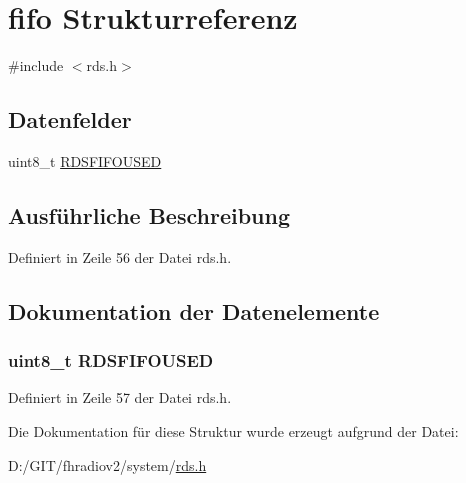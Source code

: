 \hypertarget{structfifo}{}\section{fifo Strukturreferenz}
\label{structfifo}


{\ttfamily \#include $<$rds.\+h$>$}

\subsection*{Datenfelder}
\begin{DoxyCompactItemize}
\item 
uint8\+\_\+t \hyperlink{structfifo_a8f4ac68e6765f535c5abca00d2a32a89}{R\+D\+S\+F\+I\+F\+O\+U\+S\+E\+D}
\end{DoxyCompactItemize}


\subsection{Ausführliche Beschreibung}


Definiert in Zeile 56 der Datei rds.\+h.



\subsection{Dokumentation der Datenelemente}
\hypertarget{structfifo_a8f4ac68e6765f535c5abca00d2a32a89}{}
\subsubsection[{R\+D\+S\+F\+I\+F\+O\+U\+S\+E\+D}]{\setlength{\rightskip}{0pt plus 5cm}uint8\+\_\+t R\+D\+S\+F\+I\+F\+O\+U\+S\+E\+D}\label{structfifo_a8f4ac68e6765f535c5abca00d2a32a89}


Definiert in Zeile 57 der Datei rds.\+h.



Die Dokumentation für diese Struktur wurde erzeugt aufgrund der Datei\+:\begin{DoxyCompactItemize}
\item 
D\+:/\+G\+I\+T/fhradiov2/system/\hyperlink{rds_8h}{rds.\+h}\end{DoxyCompactItemize}
